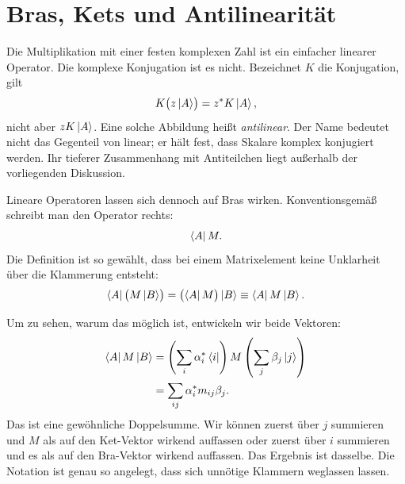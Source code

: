 \section{Bras, Kets und Antilinearität}

\begin{classroomqa}
\end{classroomqa}

Die Multiplikation mit einer festen komplexen Zahl ist ein einfacher linearer Operator. Die komplexe Konjugation ist es nicht. Bezeichnet \(K\) die Konjugation, gilt
\[
K\bigl(z\left\lvert A\right\rangle\bigr)=z^*K\left\lvert A\right\rangle,
\]
nicht aber \(zK\left\lvert A\right\rangle\). Eine solche Abbildung heißt \emph{antilinear}. Der Name bedeutet nicht das Gegenteil von linear; er hält fest, dass Skalare komplex konjugiert werden. Ihr tieferer Zusammenhang mit Antiteilchen liegt außerhalb der vorliegenden Diskussion.

Lineare Operatoren lassen sich dennoch auf Bras wirken. Konventionsgemäß schreibt man den Operator rechts:
\begin{equation}
\left\langle A\right\rvert M.
\end{equation}
Die Definition ist so gewählt, dass bei einem Matrixelement keine Unklarheit über die Klammerung entsteht:
\begin{equation}
\left\langle A\right\rvert\bigl(M\left\lvert B\right\rangle\bigr)
=
\bigl(\left\langle A\right\rvert M\bigr)\left\lvert B\right\rangle
\equiv
\left\langle A\right\rvert M\left\lvert B\right\rangle.
\label{eq:bracket-independence}
\end{equation}

Um zu sehen, warum das möglich ist, entwickeln wir beide Vektoren:
\begin{align}
\left\langle A\right\rvert M\left\lvert B\right\rangle
 &=\left(\sum_i\alpha_i^*\left\langle i\right\rvert\right)
   M
   \left(\sum_j\beta_j\left\lvert j\right\rangle\right)\\
 &=\sum_{ij}\alpha_i^*m_{ij}\beta_j.
\label{eq:matrix-element-double-sum}
\end{align}
Das ist eine gewöhnliche Doppelsumme. Wir können zuerst über \(j\) summieren und \(M\) als auf den Ket-Vektor wirkend auffassen oder zuerst über \(i\) summieren und es als auf den Bra-Vektor wirkend auffassen. Das Ergebnis ist dasselbe. Die Notation ist genau so angelegt, dass sich unnötige Klammern weglassen lassen.

